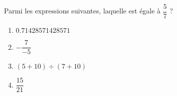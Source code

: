 
\begin{exercice}\label{exosmath-0964}

    Parmi les expressions suivantes, laquelle est égale à \( \dfrac{ 5 }{ 7 }\) ?
    \begin{multicols}{2}
        \begin{enumerate}
            \item
               $ 0.71428571428571$
            \item
                \( -\dfrac{ 7 }{ -5 }\)
            \item
                \( (5+10)\div(7+10)\)
            \item   \label{ItemSEATooZFmNGgd}
                \( \dfrac{ 15 }{ 21 }\)
        \end{enumerate}
    \end{multicols}

\end{exercice}
